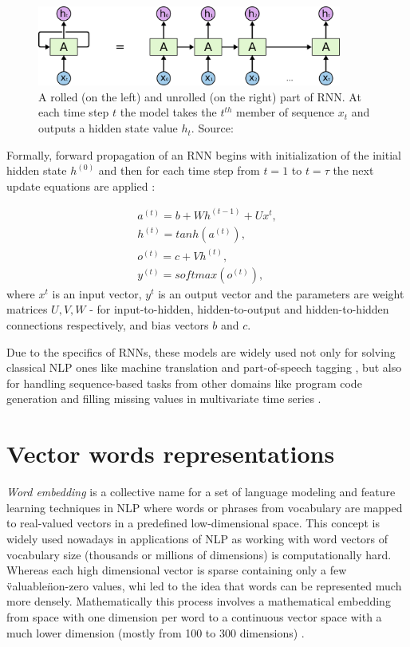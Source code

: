 \begin{figure}[h]
    \centering
    \includegraphics[width=10cm]{Images/RNN-unrolled.png}
    \caption{A rolled (on the left) and unrolled (on the right) part of RNN. At each time step $t$ the model takes the $t^{th}$ member of sequence $x_t$ and outputs a hidden state value $h_t$. Source: \citep{Olah-2015}}
    \label{fig:rnn}
\end{figure} 

Formally, forward propagation of an RNN begins with initialization of the initial hidden state $h^{(0)}$ and then for each time step from $t=1$ to $t=\tau$ the next update equations are applied \citep{Goodfellow-2016}:

\begin{equation}\label{eq:rnn}
\begin{gathered} 
    a^{(t)} = b+Wh^{(t-1)}+Ux^{t}, \\
    h^{(t)} = tanh(a^{(t)}), \\
    o^{(t)} = c+Vh^{(t)}, \\
    y^{(t)} = softmax(o^{(t)}),
\end{gathered}
\end{equation}
where $x^{t}$ is an input vector, $y^{t}$ is an output vector and the parameters are weight matrices $U, V, W$ - for input-to-hidden, hidden-to-output and hidden-to-hidden connections respectively, and bias vectors $b$ and $c$.

Due to the specifics of RNNs, these models are widely used not only for solving classical NLP ones like machine translation \citep{Chen-2018} and part-of-speech tagging \citep{Plank-2016}, but also for handling sequence-based tasks from other domains like program code generation \citep{Stehnii-2017} and filling missing values in multivariate time series \citep{Che-2016}.

\section{Vector words representations}

\textit{Word embedding} is a collective name for a set of language modeling and feature learning techniques in NLP where words or phrases from vocabulary are mapped to real-valued vectors in a predefined low-dimensional space. This concept is widely used nowadays in applications of NLP as working with word vectors of vocabulary size (thousands or millions of dimensions) is computationally hard. Whereas each high dimensional vector is sparse containing only a few \"valuable\" non-zero values, whi led to the idea that words can be represented much more densely. Mathematically this process involves a mathematical embedding from space with one dimension per word to a continuous vector space with a much lower dimension (mostly from 100 to 300 dimensions) \citep{Brownlee-2017}.


